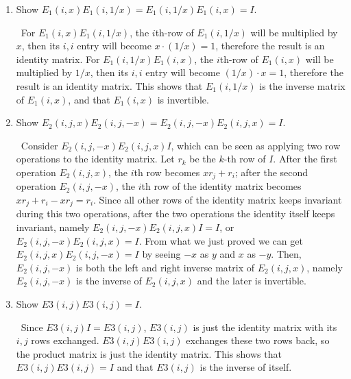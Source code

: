 \begin{exercise}{12}
\begin{enumerate}
\item Show $E_1(i,x)E_1(i,1/x) = E_1(i,1/x)E_1(i,x) = I$.

\Proof\ For $E_1(i,x)E_1(i,1/x)$, the $i$th-row of $E_1(i,1/x)$ will be multiplied by $x$, then its $i,i$ entry will become $x \cdot (1/x) = 1$, therefore the result is an identity matrix. For $E_1(i,1/x)E_1(i,x)$, the $i$th-row of $E_1(i,x)$ will be multiplied by $1/x$, then its $i,i$ entry will become $(1/x) \cdot x = 1$, therefore the result is an identity matrix. This shows that $E_1(i,1/x)$ is the inverse matrix of $E_1(i,x)$, and that $E_1(i,x)$ is invertible. \rQED

\item Show $E_2(i,j,x)E_2(i,j,-x) = E_2(i,j,-x)E_2(i,j,x) = I$.

\Proof\ Consider $E_2(i,j,-x)E_2(i,j,x)I$, which can be seen as applying two row operations to the identity matrix. Let $r_k$ be the $k$-th row of $I$. After the first operation $E_2(i,j,x)$, the $i$th row becomes $xr_j + r_i$; after the second operation $E_2(i,j,-x)$, the $i$th row of the identity matrix becomes $xr_j + r_i - xr_j = r_i$. Since all other rows of the identity matrix keeps invariant during this two operations, after the two operations the identity itself keeps invariant, namely $E_2(i,j,-x)E_2(i,j,x)I = I$, or $E_2(i,j,-x)E_2(i,j,x)=I$. From what we just proved we can get $E_2(i,j,x)E_2(i,j,-x) = I$ by seeing $-x$ as $y$ and $x$ as $-y$. Then, $E_2(i,j,-x)$ is both the left and right inverse matrix of $E_2(i,j,x)$, namely $E_2(i,j,-x)$ is the inverse of $E_2(i,j,x)$ and the later is invertible. \rQED

\item Show $E3(i,j)E3(i,j) = I$.

\Proof\ Since $E3(i,j)I = E3(i,j)$, $E3(i,j)$ is just the identity matrix with its $i,j$ rows exchanged. $E3(i,j)E3(i,j)$ exchanges these two rows back, so the product matrix is just the identity matrix. This shows that $E3(i,j)E3(i,j) = I$ and that $E3(i,j)$ is the inverse of itself. \rQED
\end{enumerate}
\end{exercise}